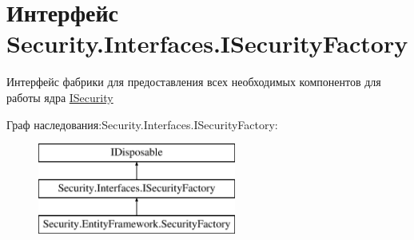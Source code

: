 \hypertarget{interface_security_1_1_interfaces_1_1_i_security_factory}{}\section{Интерфейс Security.\+Interfaces.\+I\+Security\+Factory}
\label{interface_security_1_1_interfaces_1_1_i_security_factory}


Интерфейс фабрики для предоставления всех необходимых компонентов для работы ядра \hyperlink{interface_security_1_1_interfaces_1_1_i_security}{I\+Security}  


Граф наследования\+:Security.\+Interfaces.\+I\+Security\+Factory\+:\begin{figure}[H]
\begin{center}
\leavevmode
\includegraphics[height=3.000000cm]{de/ded/interface_security_1_1_interfaces_1_1_i_security_factory}
\end{center}
\end{figure}
